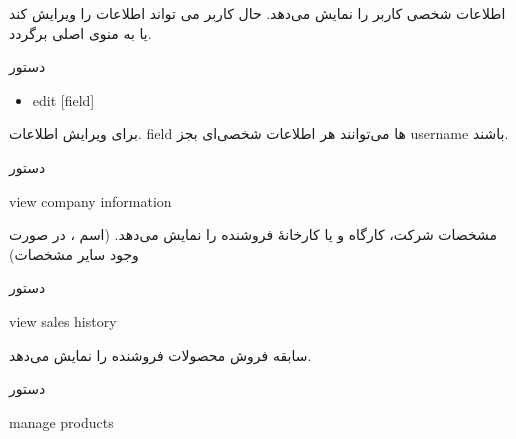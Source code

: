 \documentclass[]{article}
\begin{document}
اطلاعات شخصی کاربر را نمایش می‌دهد. حال کاربر می تواند اطلاعات را ویرایش کند یا به منوی اصلی برگردد.

\begin{mybox}[colback=brilliantlavender]{دستور}

\begin{latin}

\begin{itemize}[label = {$\Rightarrow$}]

\item
edit [field] 

\end{itemize}

\end{latin}

\end{mybox}

برای ویرایش اطلاعات. field ها می‌توانند هر اطلاعات شخصی‌ای بجز username باشند.

\hrulefill

\begin{mybox}[colback=yellow]{دستور}

\begin{latin}

view company information

\end{latin}

\end{mybox}

مشخصات شرکت، کارگاه و یا کارخانهٔ فروشنده را نمایش می‌دهد. (اسم ، در صورت وجود سایر مشخصات) 

\hrulefill

\begin{mybox}[colback=yellow]{دستور}

\begin{latin}

view sales history

\end{latin}

\end{mybox}

سابقه فروش محصولات فروشنده را نمایش می‌دهد.


\hrulefill

\newpage

\begin{mybox}[colback=yellow]{دستور}

\begin{latin}

manage products

\end{latin}

\end{mybox}
\end{document}

